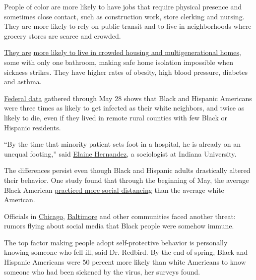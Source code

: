 People of color are more likely to have jobs that require physical
presence and sometimes close contact, such as construction work, store
clerking and nursing. They are more likely to rely on public transit and
to live in neighborhoods where grocery stores are scarce and crowded.

\href{https://www.nytimes.com/interactive/2020/07/05/us/coronavirus-latinos-african-americans-cdc-data.html}{They
are}
\href{https://www.pewresearch.org/fact-tank/2018/04/05/a-record-64-million-americans-live-in-multigenerational-households/}{more
likely to live in crowded housing and multigenerational homes}, some
with only one bathroom, making safe home isolation impossible when
sickness strikes. They have higher rates of obesity, high blood
pressure, diabetes and asthma.

\href{https://www.nytimes.com/interactive/2020/07/05/us/coronavirus-latinos-african-americans-cdc-data.html}{Federal
data} gathered through May 28 shows that Black and Hispanic Americans
were three times as likely to get infected as their white neighbors, and
twice as likely to die, even if they lived in remote rural counties with
few Black or Hispanic residents.

``By the time that minority patient sets foot in a hospital, he is
already on an unequal footing,'' said
\href{https://www.newswise.com/coronavirus/iu-professor-available-to-discuss-social-bias-and-inequality-in-covid-crisis/?article_id=729760}{Elaine
Hernandez}, a sociologist at Indiana University.

The differences persist even though Black and Hispanic adults
drastically altered their behavior. One study found that through the
beginning of May, the average Black American
\href{https://www.medrxiv.org/content/10.1101/2020.06.04.20119131v1}{practiced
more social distancing} than the average white American.

Officials in
\href{https://blockclubchicago.org/2020/04/07/black-people-are-not-immune-to-coronavirus-debunking-deadly-social-media-myths/}{Chicago},
\href{https://www.baltimoresun.com/coronavirus/bs-md-baltimore-coronavirus-black-messaging-testing-20200414-cgqbwz6cmffabel364ixfktlje-story.html}{Baltimore}
and other communities faced another threat: rumors flying about social
media that Black people were somehow immune.

The top factor making people adopt self-protective behavior is
personally knowing someone who fell ill, said Dr. Redbird. By the end of
spring, Black and Hispanic Americans were 50 percent more likely than
white Americans to know someone who had been sickened by the virus, her
surveys found.

